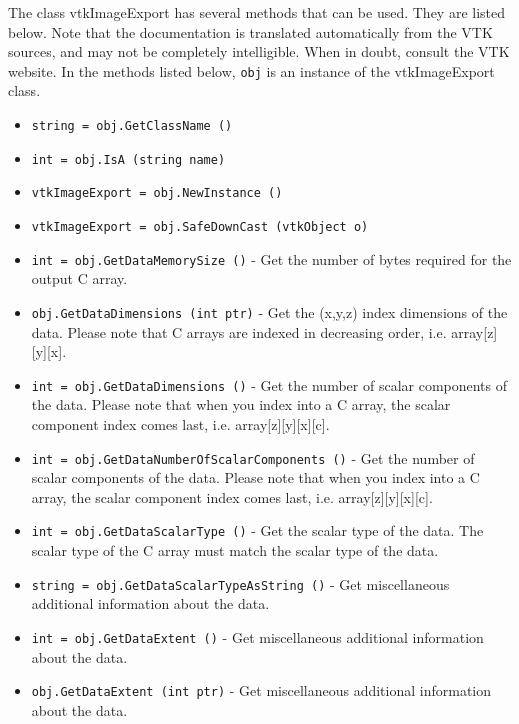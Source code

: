 The class vtkImageExport has several methods that can be used.
  They are listed below.
Note that the documentation is translated automatically from the VTK sources,
and may not be completely intelligible.  When in doubt, consult the VTK website.
In the methods listed below, \verb|obj| is an instance of the vtkImageExport class.
\begin{itemize}
\item  \verb|string = obj.GetClassName ()|

\item  \verb|int = obj.IsA (string name)|

\item  \verb|vtkImageExport = obj.NewInstance ()|

\item  \verb|vtkImageExport = obj.SafeDownCast (vtkObject o)|

\item  \verb|int = obj.GetDataMemorySize ()| -  Get the number of bytes required for the output C array.

\item  \verb|obj.GetDataDimensions (int ptr)| -  Get the (x,y,z) index dimensions of the data.  Please note
 that C arrays are indexed in decreasing order, i.e. array[z][y][x]. 

\item  \verb|int = obj.GetDataDimensions ()| -  Get the number of scalar components of the data.  Please note that
 when you index into a C array, the scalar component index comes
 last, i.e. array[z][y][x][c].

\item  \verb|int = obj.GetDataNumberOfScalarComponents ()| -  Get the number of scalar components of the data.  Please note that
 when you index into a C array, the scalar component index comes
 last, i.e. array[z][y][x][c].

\item  \verb|int = obj.GetDataScalarType ()| -  Get the scalar type of the data.  The scalar type of the C array
 must match the scalar type of the data.

\item  \verb|string = obj.GetDataScalarTypeAsString ()| -  Get miscellaneous additional information about the data.

\item  \verb|int = obj.GetDataExtent ()| -  Get miscellaneous additional information about the data.

\item  \verb|obj.GetDataExtent (int ptr)| -  Get miscellaneous additional information about the data.


\end{itemize}
